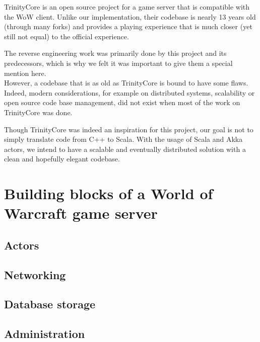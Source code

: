 \documentclass[paper=a4, fontsize=11pt]{scrartcl}
\begin{document}
TrinityCore is an open source project for a game server that is compatible with
the \gls{WoW} client.
Unlike our implementation, their codebase is nearly 13 years old (through many
forks) and provides a playing experience that is much closer (yet still not
equal) to the official experience.

The reverse engineering work was primarily done by this project and its
predecessors, which is why we felt it was important to give them a special
mention here.\\

However, a codebase that is as old as TrinityCore is bound to have some
flaws. Indeed, modern considerations, for example on distributed systems,
scalability or open source code base management, did not exist when most of the
work on TrinityCore was done.

Though TrinityCore was indeed an inspiration for this project, our goal is not
to simply translate code from C++ to Scala.
With the usage of Scala and Akka actors, we intend to have a scalable and
eventually distributed solution with a clean and hopefully elegant codebase.

\section{Building blocks of a World of Warcraft game server}

\subsection{Actors}


\subsection{Networking}

\subsection{Database storage}

\subsection{Administration}

\end{document}
